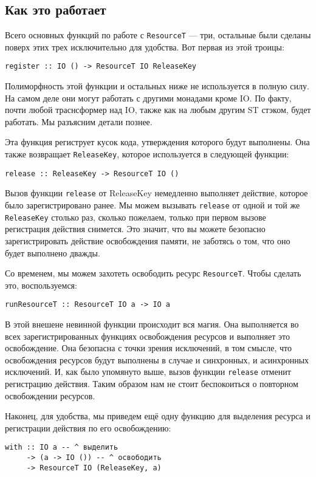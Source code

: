 \subsection{Как это работает}
Всего основных функций по работе с \lstinline'ResourceT' --- три, остальные были
сделаны поверх этих трех исключительно для удобства. Вот первая из этой троицы:
\begin{lstlisting}
register :: IO () -> ResourceT IO ReleaseKey
\end{lstlisting}
Полиморфность этой функции и остальных ниже не используется в полную силу. На самом деле
они могут работать с другими монадами кроме IO. По факту, почти любой траснсформер над
IO, также как на любым другим ST стэком, будет работать. Мы разъясним детали познее.

Эта функция региструет кусок кода, утверждения которого будут выполнены. Она также
возвращает \lstinline'ReleaseKey', которое используется в следующей функции:

\begin{lstlisting}
release :: ReleaseKey -> ResourceT IO ()
\end{lstlisting}
Вызов функции \verb=release= от ReleaseKey немедленно выполняет действие, которое было
зарегистрировано ранее. Мы можем вызывать \verb=release= от одной и той же
\lstinline'ReleaseKey'
столько раз, сколько пожелаем, только при первом вызове регистрация действия снимется. Это
значит, что вы можете безопасно зарегистрировать действие освобождения памяти, не
заботясь о том, что оно будет выполнено дважды.

Со временем, мы можем захотеть освободить ресурс \lstinline'ResourceT'. Чтобы сделать это,
воспользуемся:
\begin{lstlisting}
runResourceT :: ResourceT IO a -> IO a
\end{lstlisting}
В этой внешене невинной функции происходит вся магия. Она выполняется во всех
зарегистрированных функциях освобождения ресурсов и выполняет это освобождение. 
Она безопасна с точки зрения исключений, в
том смысле, что освобождения ресурсов будут выполнены в случае и синхронных, и
асинхронных исключений. И, как было упомянуто выше, вызов функции \lstinline'release'
отменит
регистрацию действия. Таким образом нам не стоит беспокоиться о повторном освобождении
ресурсов.

Наконец, для удобства, мы приведем ещё одну функцию для выделения ресурса и регистрации
действия по его освобождению:
\begin{lstlisting}
with :: IO a -- ^ выделить
     -> (a -> IO ()) -- ^ освободить
     -> ResourceT IO (ReleaseKey, a)
\end{lstlisting}

